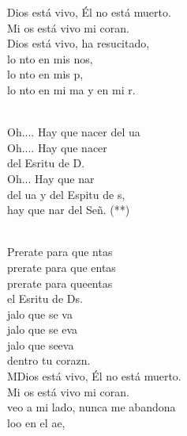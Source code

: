 \documentclass[12pt]{article}
\begin{document}
\begin{multicols*}{2}
\begin{cancion}%
	 Dios está vivo, Él no está muerto.\\
	Mi os está vivo mi coran. \\
	 Dios está vivo, ha resucitado,\\
	lo nto en mis nos,\\
	lo nto en mis p,\\
	lo nto en mi ma y en mi r.\\\jump\\
	\begin{chorus}%
	Oh.... Hay que nacer del ua\\
	Oh.... Hay que nacer\\
	del Esritu de D. \\
	Oh... Hay que nar\\
	del ua y del Espitu de s,\\
	hay que nar del Señ. (**) \\
	\end{chorus}%
	\jump\\
	Prerate para que ntas \\
	prerate para que entas \\
	prerate para queentas\\
	el Esritu de Ds. \\
\jump
	jalo que se va \\
	jalo que se eva \\
	jalo que seeva\\
	dentro  tu corazn.\\
\jump
	MDios está vivo, Él no está muerto.\\
	Mi os está vivo mi coran. \\
	 veo a mi lado, nunca me abandona\\
	loo en el ae,\\

\end{cancion}
\end{multicols*}
\end{document}
